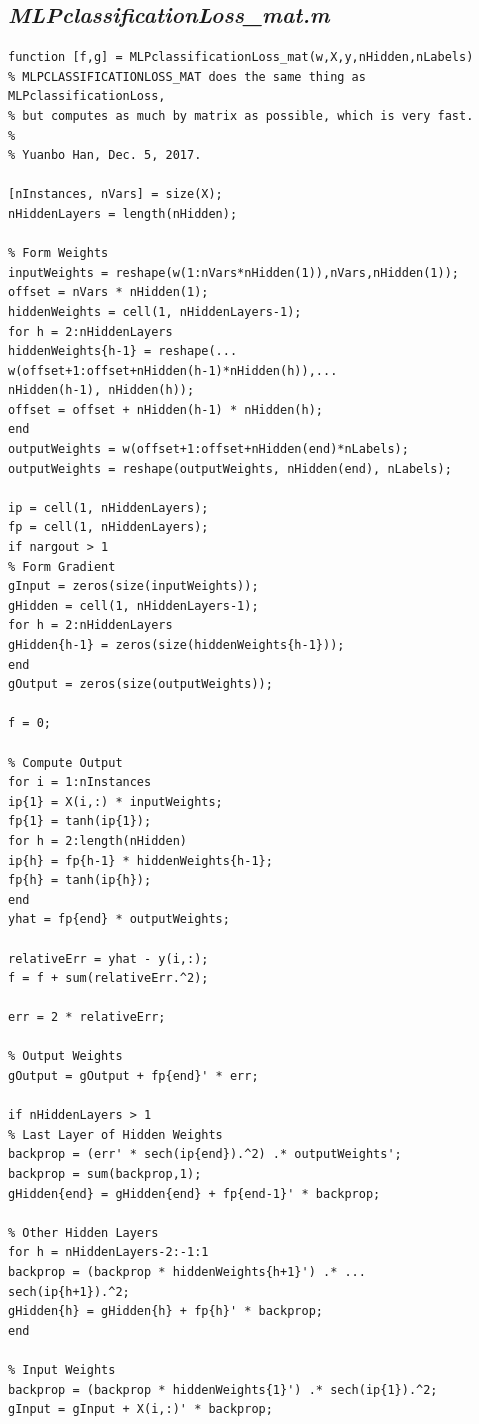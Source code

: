 \documentclass{article}
\begin{document}
\subsection{\emph{MLPclassificationLoss\_mat.m}}
\begin{lstlisting}
function [f,g] = MLPclassificationLoss_mat(w,X,y,nHidden,nLabels)
% MLPCLASSIFICATIONLOSS_MAT does the same thing as MLPclassificationLoss,
% but computes as much by matrix as possible, which is very fast.
%
% Yuanbo Han, Dec. 5, 2017.

[nInstances, nVars] = size(X);
nHiddenLayers = length(nHidden);

% Form Weights
inputWeights = reshape(w(1:nVars*nHidden(1)),nVars,nHidden(1));
offset = nVars * nHidden(1);
hiddenWeights = cell(1, nHiddenLayers-1);
for h = 2:nHiddenLayers
hiddenWeights{h-1} = reshape(...
w(offset+1:offset+nHidden(h-1)*nHidden(h)),...
nHidden(h-1), nHidden(h));
offset = offset + nHidden(h-1) * nHidden(h);
end
outputWeights = w(offset+1:offset+nHidden(end)*nLabels);
outputWeights = reshape(outputWeights, nHidden(end), nLabels);

ip = cell(1, nHiddenLayers);
fp = cell(1, nHiddenLayers);
if nargout > 1
% Form Gradient
gInput = zeros(size(inputWeights));
gHidden = cell(1, nHiddenLayers-1);
for h = 2:nHiddenLayers
gHidden{h-1} = zeros(size(hiddenWeights{h-1}));
end
gOutput = zeros(size(outputWeights));

f = 0;

% Compute Output
for i = 1:nInstances
ip{1} = X(i,:) * inputWeights;
fp{1} = tanh(ip{1});
for h = 2:length(nHidden)
ip{h} = fp{h-1} * hiddenWeights{h-1};
fp{h} = tanh(ip{h});
end
yhat = fp{end} * outputWeights;

relativeErr = yhat - y(i,:);
f = f + sum(relativeErr.^2);

err = 2 * relativeErr;

% Output Weights
gOutput = gOutput + fp{end}' * err;

if nHiddenLayers > 1
% Last Layer of Hidden Weights
backprop = (err' * sech(ip{end}).^2) .* outputWeights';
backprop = sum(backprop,1);
gHidden{end} = gHidden{end} + fp{end-1}' * backprop;

% Other Hidden Layers
for h = nHiddenLayers-2:-1:1
backprop = (backprop * hiddenWeights{h+1}') .* ...
sech(ip{h+1}).^2;
gHidden{h} = gHidden{h} + fp{h}' * backprop;
end

% Input Weights
backprop = (backprop * hiddenWeights{1}') .* sech(ip{1}).^2;
gInput = gInput + X(i,:)' * backprop;


\end{lstlisting}
\end{document}
